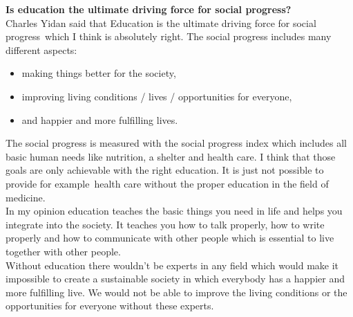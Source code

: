 \documentclass[12pt,a4paper]{report}
\newcommand{\fe}[0]{for example\ }
\begin{document}
	\noindent
	\Large
	\textbf{Is education the ultimate driving force for social progress?}
	\large
	\\
	Charles Yidan said that \dq Education is the ultimate driving force for social progress\dq\ which I think is absolutely right. 
	The social progress includes many different aspects:
	\begin{itemize}
		\item making things better for the society,
		\item improving living conditions / lives / opportunities for everyone,
		\item and happier and more fulfilling lives.
	\end{itemize}
	The social progress is measured with the social progress index which includes all basic human needs like nutrition, a shelter and health care.
	I think that those goals are only achievable with the right education.
	It is just not possible to provide \fe health care without the proper education in the field of medicine.
	\\
	In my opinion education teaches the basic things you need in life and helps you integrate into the society.
	It teaches you how to talk properly, how to write properly and how to communicate with other people which is essential to live together with other people. \\
	Without education there wouldn't be experts in any field which would make it impossible to create a sustainable society in which everybody has a happier and more fulfilling live.
	We would not be able to improve the living conditions or the opportunities for everyone without these experts.
\end{document}
